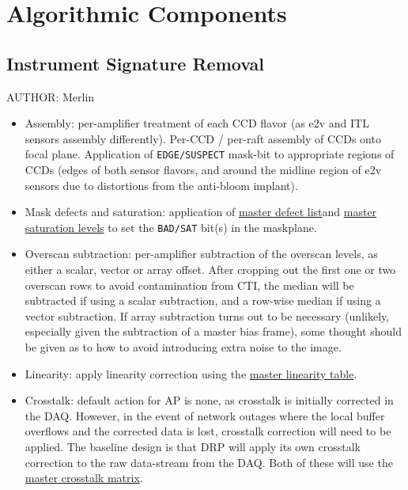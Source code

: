 \section{Algorithmic Components}
\label{sec:algorithmic-components}

\subsection{Instrument Signature Removal}
\label{sec:acISR}
AUTHOR: Merlin\\
\begin{itemize}

\item Assembly: per-amplifier treatment of each CCD flavor (as e2v and ITL sensors assembly differently). Per-CCD / per-raft assembly of CCDs onto focal plane. Application of \texttt{EDGE/SUSPECT} mask-bit to appropriate regions of CCDs (edges of both sensor flavors, and around the midline region of e2v sensors due to distortions from the anti-bloom implant).

\item Mask defects and saturation: application of \hyperref[calibProducts:defectList]{master defect list}and \hyperref[calibProducts:saturationLevel]{master saturation levels} to set the \texttt{BAD/SAT} bit(s) in the maskplane.

\item Overscan subtraction: per-amplifier subtraction of the overscan levels, as either a scalar, vector or array offset. After cropping out the first one or two overscan rows to avoid contamination from CTI, the median will be subtracted if using a scalar subtraction, and a row-wise median if using a vector subtraction. If array subtraction turns out to be necessary (unlikely, especially given the subtraction of a master bias frame), some thought should be given as to how to avoid introducing extra noise to the image.

\item Linearity: apply linearity correction using the \hyperref[calibProducts:linearityCurve]{master linearity table}.

\item Crosstalk: default action for AP is none, as crosstalk is initially corrected in the DAQ. However, in the event of network outages where the local buffer overflows and the corrected data is lost, crosstalk correction will need to be applied. The baseline design is that DRP will apply its own crosstalk correction to the raw data-stream from the DAQ. Both of these will use the \hyperref[calibProducts:crosstalk]{master crosstalk matrix}.


\end{itemize}
